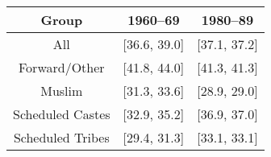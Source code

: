 \begin{tabular}{ccc} 
\hline
\hline
Group & 1960--69 & 1980--89 \\
\hline 
All & [36.6, 39.0] &
[37.1, 37.2] \\
Forward/Other & [41.8, 44.0] &
[41.3, 41.3] \\
Muslim & [31.3, 33.6] & [28.9, 29.0] \\
Scheduled Castes & [32.9, 35.2] & [36.9, 37.0] \\
Scheduled Tribes & [29.4, 31.3] & [33.1, 33.1] \\
\hline
\hline 
\end{tabular}
